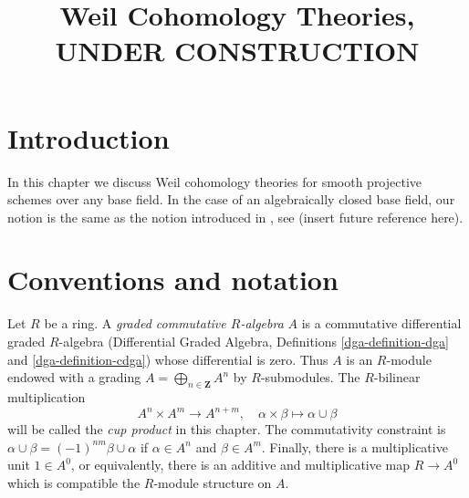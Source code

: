 

%


\title{Weil Cohomology Theories, UNDER CONSTRUCTION}


\maketitle

\label{section-phantom}

\tableofcontents

\section{Introduction}
\label{section-introduction}

\noindent
In this chapter we discuss Weil cohomology theories for smooth
projective schemes over any base field. In the case of an algebraically
closed base field, our notion is the same as the notion introduced
in \cite{Kleiman-cycles}, see (insert future reference here).





\section{Conventions and notation}
\label{section-conventions}

\noindent
Let $R$ be a ring. A {\it graded commutative $R$-algebra} $A$ is a
commutative differential graded $R$-algebra
(Differential Graded Algebra, Definitions \ref{dga-definition-dga} and
\ref{dga-definition-cdga}) whose differential is zero. Thus $A$
is an $R$-module endowed with a grading
$A = \bigoplus_{n \in \mathbf{Z}} A^n$ by
$R$-submodules. The $R$-bilinear multiplication
$$
A^n \times A^m \longrightarrow A^{n + m},\quad
\alpha \times \beta \longmapsto \alpha \cup \beta
$$
will be called the {\it cup product} in this chapter.
The commutativity constraint is
$\alpha \cup \beta = (-1)^{nm} \beta \cup \alpha$ if
$\alpha \in A^n$ and $\beta \in A^m$. Finally, there is
a multiplicative unit $1 \in A^0$, or equivalently, there is an
additive and multiplicative map $R \to A^0$ which is compatible the
$R$-module structure on $A$.

